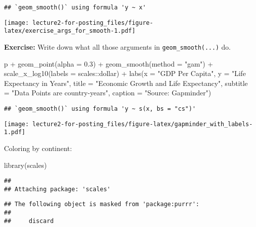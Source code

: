 \documentclass[
]{article}
\newenvironment{Shaded}{\begin{snugshade}}{\end{snugshade}}
\newcommand{\AttributeTok}[1]{\textcolor[rgb]{0.77,0.63,0.00}{#1}}
\newcommand{\FloatTok}[1]{\textcolor[rgb]{0.00,0.00,0.81}{#1}}
\newcommand{\FunctionTok}[1]{\textcolor[rgb]{0.00,0.00,0.00}{#1}}
\newcommand{\NormalTok}[1]{#1}
\newcommand{\SpecialCharTok}[1]{\textcolor[rgb]{0.00,0.00,0.00}{#1}}
\newcommand{\StringTok}[1]{\textcolor[rgb]{0.31,0.60,0.02}{#1}}
\begin{document}
\begin{verbatim}
## `geom_smooth()` using formula 'y ~ x'
\end{verbatim}

\texttt{[image: lecture2-for-posting\_files/figure-latex/exercise\_args\_for\_smooth-1.pdf]}

\textbf{Exercise:} Write down what all those arguments in
\texttt{geom\_smooth(...)} do.

\begin{Shaded}
\begin{Highlighting}[]
\NormalTok{p }\SpecialCharTok{+} \FunctionTok{geom\_point}\NormalTok{(}\AttributeTok{alpha =} \FloatTok{0.3}\NormalTok{) }\SpecialCharTok{+} 
  \FunctionTok{geom\_smooth}\NormalTok{(}\AttributeTok{method =} \StringTok{"gam"}\NormalTok{) }\SpecialCharTok{+} 
  \FunctionTok{scale\_x\_log10}\NormalTok{(}\AttributeTok{labels =}\NormalTok{ scales}\SpecialCharTok{::}\NormalTok{dollar) }\SpecialCharTok{+}
  \FunctionTok{labs}\NormalTok{(}\AttributeTok{x =} \StringTok{"GDP Per Capita"}\NormalTok{, }\AttributeTok{y =} \StringTok{"Life Expectancy in Years"}\NormalTok{,}
       \AttributeTok{title =} \StringTok{"Economic Growth and Life Expectancy"}\NormalTok{,}
       \AttributeTok{subtitle =} \StringTok{"Data Points are country{-}years"}\NormalTok{,}
       \AttributeTok{caption =} \StringTok{"Source: Gapminder"}\NormalTok{)}
\end{Highlighting}
\end{Shaded}

\begin{verbatim}
## `geom_smooth()` using formula 'y ~ s(x, bs = "cs")'
\end{verbatim}

\texttt{[image: lecture2-for-posting\_files/figure-latex/gapminder\_with\_labels-1.pdf]}

Coloring by continent:

\begin{Shaded}
\begin{Highlighting}[]
\FunctionTok{library}\NormalTok{(scales)}
\end{Highlighting}
\end{Shaded}

\begin{verbatim}
## 
## Attaching package: 'scales'
\end{verbatim}

\begin{verbatim}
## The following object is masked from 'package:purrr':
## 
##     discard
\end{verbatim}
\end{document}
